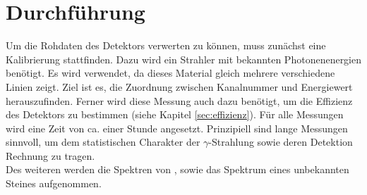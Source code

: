 \section{Durchführung}
\label{sec:Durchführung}
Um die Rohdaten des Detektors verwerten zu können, muss zunächst eine Kalibrierung stattfinden. Dazu wird ein Strahler mit bekannten Photonenenergien benötigt. Es wird  verwendet, da dieses Material gleich mehrere verschiedene Linien zeigt. Ziel ist es, die Zuordnung zwischen Kanalnummer und Energiewert herauszufinden. Ferner wird diese Messung auch dazu benötigt, um die Effizienz des Detektors zu bestimmen (siehe Kapitel \ref{sec:effizienz}). Für alle Messungen wird eine Zeit von ca. einer Stunde angesetzt. Prinzipiell sind lange Messungen sinnvoll, um dem statistischen Charakter der $\gamma$-Strahlung sowie deren Detektion Rechnung zu tragen.\\
Des weiteren werden die Spektren von ,  sowie das Spektrum eines unbekannten Steines aufgenommen.
